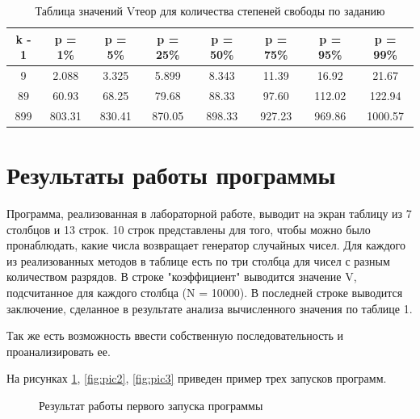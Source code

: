 \documentclass[14pt, a4paper]{extarticle}
\begin{document}
\begin{table}[H]
\centering
\begin{tabular}{ | c | c | c | c | c | c | c | c |}
\hline
 k - 1 & p = 1\% & p = 5\% & p = 25\% & p = 50\% & p = 75\% & p = 95\% & p = 99\% \\ \hline
9 & 2.088 & 3.325 & 5.899 & 8.343 & 11.39 & 16.92 & 21.67 \\ \hline
89 & 60.93 & 68.25 & 79.68 & 88.33 & 97.60 & 112.02 & 122.94 \\ \hline
899 & 803.31 & 830.41 & 870.05 & 898.33 & 927.23 & 969.86 & 1000.57 \\ \hline
\end{tabular}
\caption{Таблица значений Vтеор для количества степеней свободы по заданию}
\end{table}

\section{Результаты работы программы}

Программа, реализованная в лабораторной работе, выводит на экран таблицу из 7 столбцов и 13 строк. 10 строк представлены для того, чтобы можно было пронаблюдать, какие числа возвращает генератор случайных чисел. Для каждого из реализованных методов в таблице есть по три столбца для чисел с разным количеством разрядов. В строке "коэффициент" выводится значение V, подсчитанное для каждого столбца (N = 10000). В последней строке выводится заключение, сделанное в результате анализа вычисленного значения по таблице 1.

Так же есть возможность ввести собственную последовательность и проанализировать ее. 

На рисунках \ref{fig:pic1}, \ref{fig:pic2}, \ref{fig:pic3} приведен пример трех запусков программ.

\begin{figure}[H]
\caption{Результат работы первого запуска программы}
\label{fig:pic1}
\end{figure}
\end{document}
